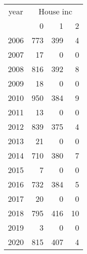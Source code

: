 \footnotesize\begin{tabular}[t]{lrrr}
\toprule
\multicolumn{1}{c}{year} & \multicolumn{3}{c}{House inc} \\
\cmidrule(l{3pt}r{3pt}){1-1} \cmidrule(l{3pt}r{3pt}){2-4}
  & 0 & 1 & 2\\
\midrule
2006 & 773 & 399 & 4\\
2007 & 17 & 0 & 0\\
2008 & 816 & 392 & 8\\
2009 & 18 & 0 & 0\\
2010 & 950 & 384 & 9\\
2011 & 13 & 0 & 0\\
2012 & 839 & 375 & 4\\
2013 & 21 & 0 & 0\\
2014 & 710 & 380 & 7\\
2015 & 7 & 0 & 0\\
2016 & 732 & 384 & 5\\
2017 & 20 & 0 & 0\\
2018 & 795 & 416 & 10\\
2019 & 3 & 0 & 0\\
2020 & 815 & 407 & 4\\
\bottomrule
\end{tabular}
